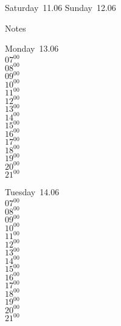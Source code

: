 \documentclass[11pt,a4paper]{book}\usepackage[]{graphicx}\usepackage[]{color}
\begin{document}
\begin{weekendbox}
  Saturday~11.06
  \tcblower
  Sunday~12.06
\end{weekendbox} %
\begin{notebox}
  Notes
\end{notebox}
\clearpage
\begin{headerbox}
\end{headerbox}
\begin{weekdaybox}
  Monday~13.06\\
  { 
  \vfill
  $07^{00}$\\
$08^{00}$\\
$09^{00}$\\
$10^{00}$\\
$11^{00}$\\
$12^{00}$\\
$13^{00}$\\
$14^{00}$\\
$15^{00}$\\
$16^{00}$\\
$17^{00}$\\
$18^{00}$\\
$19^{00}$\\
$20^{00}$\\
$21^{00}$\\
  }
\end{weekdaybox}
\begin{weekdaybox}
  Tuesday~14.06\\
  { 
  \vfill
  $07^{00}$\\
$08^{00}$\\
$09^{00}$\\
$10^{00}$\\
$11^{00}$\\
$12^{00}$\\
$13^{00}$\\
$14^{00}$\\
$15^{00}$\\
$16^{00}$\\
$17^{00}$\\
$18^{00}$\\
$19^{00}$\\
$20^{00}$\\
$21^{00}$\\
  }
\end{weekdaybox}
\end{document}
